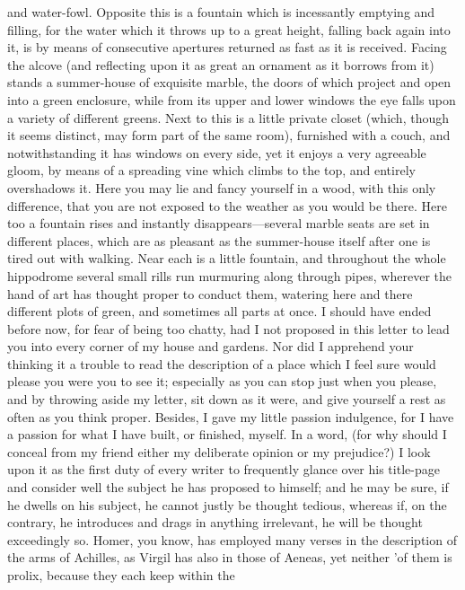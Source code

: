 and water-fowl. Opposite this is a fountain which is incessantly emptying
and filling, for the water which it throws up to a great height, falling
back again into it, is by means of consecutive apertures returned as fast
as it is received. Facing the alcove (and reflecting upon it as great an
ornament as it borrows from it) stands a summer-house of exquisite marble,
the doors of which project and open into a green enclosure, while from its
upper and lower windows the eye falls upon a variety of different greens.
Next to this is a little private closet (which, though it seems distinct,
may form part of the same room), furnished with a couch, and
notwithstanding it has windows on every side, yet it enjoys a very
agreeable gloom, by means of a spreading vine which climbs to the top, and
entirely overshadows it. Here you may lie and fancy yourself in a wood,
with this only difference, that you are not exposed to the weather as you
would be there. Here too a fountain rises and instantly disappears—several
marble seats are set in different places, which are as pleasant as the
summer-house itself after one is tired out with walking. Near each is a
little fountain, and throughout the whole hippodrome several small rills
run murmuring along through pipes, wherever the hand of art has thought
proper to conduct them, watering here and there different plots of green,
and sometimes all parts at once. I should have ended before now, for fear
of being too chatty, had I not proposed in this letter to lead you into
every corner of my house and gardens. Nor did I apprehend your thinking it
a trouble to read the description of a place which I feel sure would
please you were you to see it; especially as you can stop just when you
please, and by throwing aside my letter, sit down as it were, and give
yourself a rest as often as you think proper. Besides, I gave my little
passion indulgence, for I have a passion for what I have built, or
finished, myself. In a word, (for why should I conceal from my friend
either my deliberate opinion or my prejudice?) I look upon it as the first
duty of every writer to frequently glance over his title-page and consider
well the subject he has proposed to himself; and he may be sure, if he
dwells on his subject, he cannot justly be thought tedious, whereas if, on
the contrary, he introduces and drags in anything irrelevant, he will be
thought exceedingly so. Homer, you know, has employed many verses in the
description of the arms of Achilles, as Virgil has also in those of
Aeneas, yet neither 'of them is prolix, because they each keep within the
